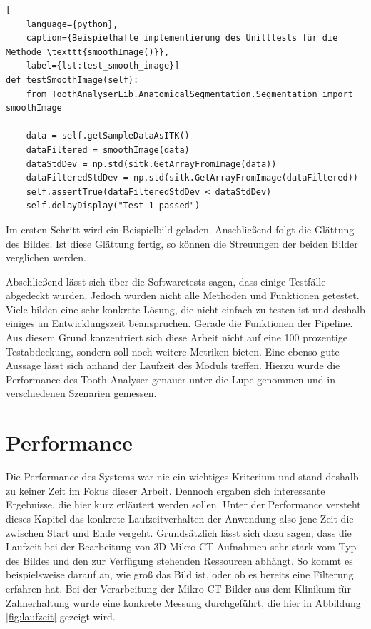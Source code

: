 \begin{lstlisting}[
    language={python},
    caption={Beispielhafte implementierung des Unitttests für die Methode \texttt{smoothImage()}},
    label={lst:test_smooth_image}]
def testSmoothImage(self):
    from ToothAnalyserLib.AnatomicalSegmentation.Segmentation import smoothImage
   
    data = self.getSampleDataAsITK()
    dataFiltered = smoothImage(data)
    dataStdDev = np.std(sitk.GetArrayFromImage(data))
    dataFilteredStdDev = np.std(sitk.GetArrayFromImage(dataFiltered))
    self.assertTrue(dataFilteredStdDev < dataStdDev)
    self.delayDisplay("Test 1 passed")
\end{lstlisting}

Im ersten Schritt wird ein Beispielbild geladen. Anschließend folgt die Glättung
des Bildes. Ist diese Glättung fertig, so können die Streuungen der beiden Bilder
verglichen werden.

Abschließend lässt sich über die Softwaretests sagen, dass einige Testfälle
abgedeckt wurden. Jedoch wurden nicht alle Methoden und Funktionen getestet.
Viele bilden eine sehr konkrete Lösung, die nicht einfach zu testen ist und deshalb
einiges an Entwicklungszeit beanspruchen. Gerade die Funktionen der Pipeline. Aus
diesem Grund konzentriert sich diese Arbeit nicht auf eine 100 prozentige Testabdeckung,
sondern soll noch weitere Metriken bieten. Eine ebenso gute Aussage lässt sich anhand
der Laufzeit des Moduls treffen. Hierzu wurde die Performance des Tooth Analyser
genauer unter die Lupe genommen und in verschiedenen Szenarien gemessen.

\pagebreak

\section{Performance}
Die Performance des Systems war nie ein wichtiges Kriterium und stand deshalb zu
keiner Zeit im Fokus dieser Arbeit. Dennoch ergaben sich interessante Ergebnisse,
die hier kurz erläutert werden sollen. Unter der Performance versteht dieses
Kapitel das konkrete Laufzeitverhalten der Anwendung also jene Zeit die zwischen
Start und Ende vergeht. Grundsätzlich lässt sich dazu sagen, dass die Laufzeit
bei der Bearbeitung von \ac{3D}-Mikro-\ac{CT}-Aufnahmen sehr stark vom Typ des
Bildes und den zur Verfügung stehenden Ressourcen abhängt. So kommt es beispielsweise darauf an, wie groß das Bild ist, oder
ob es bereits eine Filterung erfahren hat. Bei der Verarbeitung der Mikro-\ac{CT}-Bilder
aus dem Klinikum für Zahnerhaltung wurde eine konkrete Messung durchgeführt, die
hier in Abbildung \ref{fig:laufzeit} gezeigt wird.

